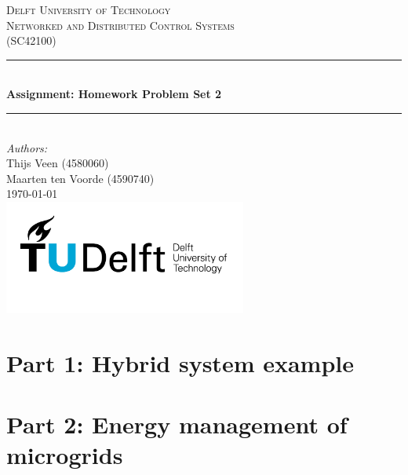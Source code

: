\documentclass[a4paper]{article}
\begin{document}
\begin{titlepage}

\newcommand{\HRule}{\rule{\linewidth}{0.5mm}} 							%
\center 
 
\textsc{\LARGE Delft University of Technology}\\[1cm]

\textsc{\Large Networked and Distributed Control Systems}\\[0.2cm]
\textsc{\large (SC42100)}\\[1cm] 										%
\HRule \\[0.8cm]
{ \huge \bfseries Assignment: Homework Problem Set 2}\\[0.7cm]								%
\HRule \\[2cm]
\large
\emph{Authors:}\\
Thijs Veen (4580060)\\
Maarten ten Voorde (4590740)\\[1.5cm]													%
{\large \today}\\[5cm]
\includegraphics[width=0.6\textwidth]{images/TU_delft_logo.jpg}\\[1cm] 	%
\vfill 
\end{titlepage}



\section{Part 1: Hybrid system example}



\section{Part 2: Energy management of microgrids}










\newpage


\end{document}
